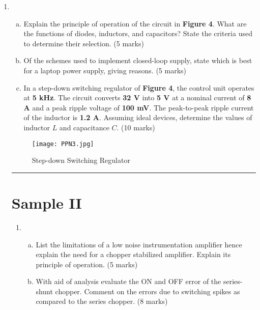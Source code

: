 \documentclass[a4paper,9pt,twoside,openany,twocolumn]{memoir}
\begin{document}
\begin{enumerate}
\begin{center}\rule{0.5\linewidth}{0.5pt}\end{center}

\item
    \begin{enumerate}[(a)]
        \item Explain the principle of operation of the circuit in \textbf{Figure 4}. What are the functions of diodes, inductors, and capacitors? State the criteria used to determine their selection. \hfill{(5 marks)}

        \item Of the schemes used to implement closed-loop supply, state which is best for a laptop power supply, giving reasons. \hfill{(5 marks)}

        \item In a step-down switching regulator of \textbf{Figure 4}, the control unit operates at \textbf{5 kHz}. The circuit converts \textbf{32 V} into \textbf{5 V} at a nominal current of \textbf{8 A} and a peak ripple voltage of \textbf{100 mV}. The peak-to-peak ripple current of the inductor is \textbf{1.2 A}. Assuming ideal devices, determine the values of inductor \( L \) and capacitance \( C \). \hfill{(10 marks)}
    \end{enumerate}

\begin{figure}[h!]
    \centering
    \texttt{[image: PPN3.jpg]}
    \caption{Step-down Switching Regulator}
\end{figure}

\begin{center}\rule{0.5\linewidth}{0.5pt}\end{center}

\section*{Sample II}

\begin{enumerate}
\item 
    \begin{enumerate}[(a)]
        \item List the limitations of a low noise instrumentation amplifier hence explain the need for a chopper stabilized amplifier. Explain its principle of operation. \hfill{(5 marks)}

        \item With aid of analysis evaluate the ON and OFF error of the series-shunt chopper. Comment on the errors due to switching spikes as compared to the series chopper. \hfill{(8 marks)}


\end{enumerate}
\end{enumerate}
\end{enumerate}
\end{document}
